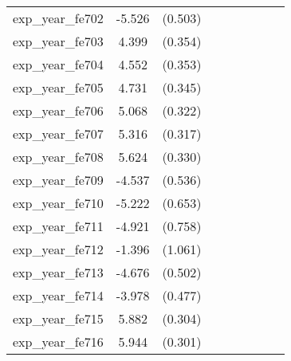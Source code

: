 {\begin{tabular}{l*{4}{cc}}
exp\_year\_fe702&   -5.526\sym{***}&  (0.503)&                  &         &                  &         &                  &         \\
exp\_year\_fe703&    4.399\sym{***}&  (0.354)&                  &         &                  &         &                  &         \\
exp\_year\_fe704&    4.552\sym{***}&  (0.353)&                  &         &                  &         &                  &         \\
exp\_year\_fe705&    4.731\sym{***}&  (0.345)&                  &         &                  &         &                  &         \\
exp\_year\_fe706&    5.068\sym{***}&  (0.322)&                  &         &                  &         &                  &         \\
exp\_year\_fe707&    5.316\sym{***}&  (0.317)&                  &         &                  &         &                  &         \\
exp\_year\_fe708&    5.624\sym{***}&  (0.330)&                  &         &                  &         &                  &         \\
exp\_year\_fe709&   -4.537\sym{***}&  (0.536)&                  &         &                  &         &                  &         \\
exp\_year\_fe710&   -5.222\sym{***}&  (0.653)&                  &         &                  &         &                  &         \\
exp\_year\_fe711&   -4.921\sym{***}&  (0.758)&                  &         &                  &         &                  &         \\
exp\_year\_fe712&   -1.396         &  (1.061)&                  &         &                  &         &                  &         \\
exp\_year\_fe713&   -4.676\sym{***}&  (0.502)&                  &         &                  &         &                  &         \\
exp\_year\_fe714&   -3.978\sym{***}&  (0.477)&                  &         &                  &         &                  &         \\
exp\_year\_fe715&    5.882\sym{***}&  (0.304)&                  &         &                  &         &                  &         \\
exp\_year\_fe716&    5.944\sym{***}&  (0.301)&                  &         &                  &         &                  &         \\

\end{tabular}}
